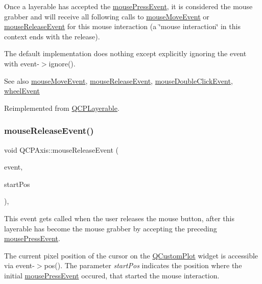 Once a layerable has accepted the \hyperlink{classQCPAxis_a61bc07cda6193a3fa6b5aa198fc4e4fa}{mouse\+Press\+Event}, it is considered the mouse grabber and will receive all following calls to \hyperlink{classQCPAxis_ac5a269609e6177737faabdc46434d8c7}{mouse\+Move\+Event} or \hyperlink{classQCPAxis_a780bee321fc6476e5fc49c4980291a01}{mouse\+Release\+Event} for this mouse interaction (a \char`\"{}mouse interaction\char`\"{} in this context ends with the release).

The default implementation does nothing except explicitly ignoring the event with {\ttfamily event-\/$>$ignore()}.

\begin{DoxySeeAlso}{See also}
\hyperlink{classQCPAxis_ac5a269609e6177737faabdc46434d8c7}{mouse\+Move\+Event}, \hyperlink{classQCPAxis_a780bee321fc6476e5fc49c4980291a01}{mouse\+Release\+Event}, \hyperlink{classQCPLayerable_a4171e2e823aca242dd0279f00ed2de81}{mouse\+Double\+Click\+Event}, \hyperlink{classQCPAxis_aa850f195d7cc470c53809d0fff5e444d}{wheel\+Event} 
\end{DoxySeeAlso}


Reimplemented from \hyperlink{classQCPLayerable_af6567604818db90f4fd52822f8bc8376}{Q\+C\+P\+Layerable}.

\mbox{\label{classQCPAxis_a780bee321fc6476e5fc49c4980291a01}} 
\subsubsection{\texorpdfstring{mouse\+Release\+Event()}{mouseReleaseEvent()}}
{\footnotesize\ttfamily void Q\+C\+P\+Axis\+::mouse\+Release\+Event (\begin{DoxyParamCaption}\item[{Q\+Mouse\+Event $\ast$}]{event,  }\item[{const Q\+PointF \&}]{start\+Pos }\end{DoxyParamCaption})\hspace{0.3cm}{\ttfamily [protected]}, {\ttfamily [virtual]}}

This event gets called when the user releases the mouse button, after this layerable has become the mouse grabber by accepting the preceding \hyperlink{classQCPAxis_a61bc07cda6193a3fa6b5aa198fc4e4fa}{mouse\+Press\+Event}.

The current pixel position of the cursor on the \hyperlink{classQCustomPlot}{Q\+Custom\+Plot} widget is accessible via {\ttfamily event-\/$>$pos()}. The parameter {\itshape start\+Pos} indicates the position where the initial \hyperlink{classQCPAxis_a61bc07cda6193a3fa6b5aa198fc4e4fa}{mouse\+Press\+Event} occured, that started the mouse interaction.

